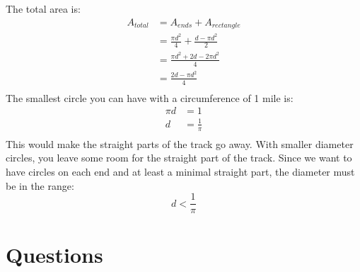 \documentclass{exam}
\begin{document}
\begin{description}
The total area is:
\begin{align*}
  A_{total} &= A_{ends} + A_{rectangle} \\
           &= \frac{\pi d^2}{4} + \frac{d - \pi d^2}{2} \\
           &= \frac{\pi d^2 + 2d - 2 \pi d^2}{4} \\
           &= \frac{2d - \pi d^2}{4} \\
\end{align*}
The smallest circle you can have with a circumference of 1 mile is:
\begin{align*}
  \pi d &= 1 \\
  d &= \frac{1}{\pi} \\
\end{align*}
This would make the straight parts of the track go away.  With smaller diameter circles, you leave some room for the
straight part of the track.  Since we want to have circles on each end and at least a minimal straight part, the
diameter must be in the range:
\[
  d < \frac{1}{\pi}
\]

\end{description}

\section{Questions}
\end{document}

